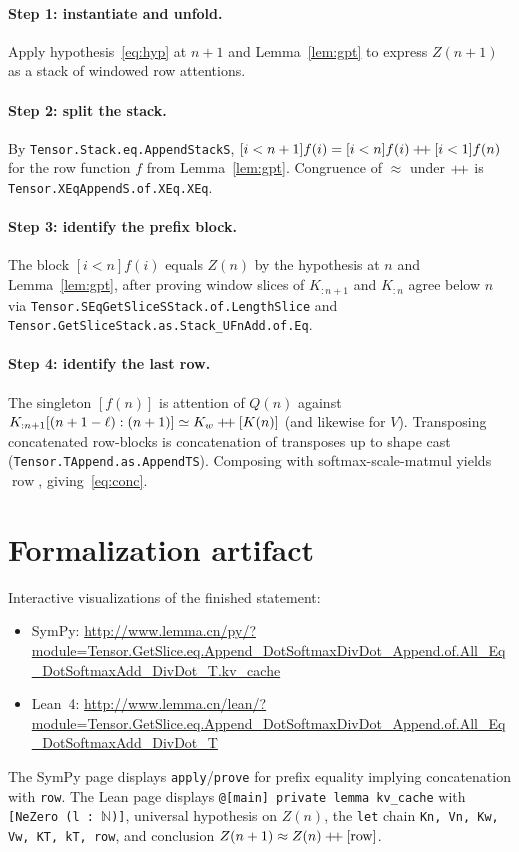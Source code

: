 \documentclass[11pt,a4paper]{article}
\newcommand{\rowop}{\operatorname{row}}
\newcommand{\concat}{\mathbin{+\mkern-4mu+}}
\newcommand{\XEq}{\approx}
\newcommand{\SEq}{\simeq}
\begin{document}
\paragraph{Step 1: instantiate and unfold.}
Apply hypothesis~\eqref{eq:hyp} at $n+1$ and Lemma~\ref{lem:gpt} to express $Z(n+1)$ as a stack of windowed row attentions.

\paragraph{Step 2: split the stack.}
By \texttt{Tensor.Stack.eq.AppendStackS},
$[i<n+1]f(i)=[i<n]f(i)\concat[i<1]f(n)$ for the row function $f$ from Lemma~\ref{lem:gpt}.
Congruence of $\XEq$ under $\concat$ is \texttt{Tensor.XEqAppendS.of.XEq.XEq}.

\paragraph{Step 3: identify the prefix block.}
The block $[i<n]f(i)$ equals $Z(n)$ by the hypothesis at $n$ and Lemma~\ref{lem:gpt}, after proving window slices of $K_{:n+1}$ and $K_{:n}$ agree below $n$ via \texttt{Tensor.SEqGetSliceSStack.of.LengthSlice} and \texttt{Tensor.GetSliceStack.as.Stack\_UFnAdd.of.Eq}.

\paragraph{Step 4: identify the last row.}
The singleton $[f(n)]$ is attention of $Q(n)$ against
$K_{:n+1}[(n+1-\ell):(n+1)]\SEq K_w\concat[K(n)]$ (and likewise for $V$).
Transposing concatenated row-blocks is concatenation of transposes up to shape cast (\texttt{Tensor.TAppend.as.AppendTS}).
Composing with softmax-scale-matmul yields $\rowop$, giving~\eqref{eq:conc}.

\section{Formalization artifact}
\label{sec:artifact}

Interactive visualizations of the finished statement:
\begin{itemize}[noitemsep]
  \item SymPy: \url{http://www.lemma.cn/py/?module=Tensor.GetSlice.eq.Append_DotSoftmaxDivDot_Append.of.All_Eq_DotSoftmaxAdd_DivDot_T.kv_cache}
  \item Lean~4: \url{http://www.lemma.cn/lean/?module=Tensor.GetSlice.eq.Append_DotSoftmaxDivDot_Append.of.All_Eq_DotSoftmaxAdd_DivDot_T}
\end{itemize}
The SymPy page displays \texttt{apply}/\texttt{prove} for prefix equality implying concatenation with \texttt{row}.
The Lean page displays \texttt{@[main] private lemma kv\_cache} with \texttt{[NeZero (l : $\mathbb{N}$)]}, universal hypothesis on $Z(n)$, the \texttt{let} chain \texttt{Kn, Vn, Kw, Vw, KT, kT, row}, and conclusion $Z(n+1)\XEq Z(n)\concat[\rowop]$.
\end{document}
